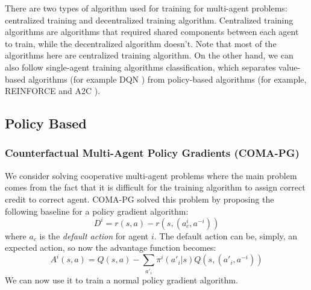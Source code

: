 \label{sec:chap2-deep-marl}

There are two types of algorithm used for training for multi-agent problems: centralized training and decentralized training algorithm. Centralized training algorithms are algorithms that required shared components between each agent to train, while the decentralized algorithm doesn't. Note that most of the algorithms here are centralized training algorithm. On the other hand, we can also follow single-agent training algorithms classification, which separates value-based algorithms (for example DQN \cite{mnih2015human}) from policy-based algorithms (for example, REINFORCE \cite{sutton2000policy} and A2C \cite{mnih2016asynchronous}). 

\subsection{Policy Based}

\subsubsection{Counterfactual Multi-Agent Policy Gradients (COMA-PG) \cite{foerster2018counterfactual}}
We consider solving cooperative multi-agent problems where the main problem comes from the fact that it is difficult for the training algorithm to assign correct credit to correct agent. COMA-PG \cite{foerster2018counterfactual} solved this problem by proposing the following baseline for a policy gradient algorithm:
\begin{equation}
    D^i = r(s, a) - r(s, (a_c^i, a^{-i}))
\end{equation}
where $a_c$ is the \textit{default action} for agent $i$. The default action can be, simply, an expected action, so now the advantage function becomes:
\begin{equation}
    A^i(s, a) = Q(s, a) - \sum_{a'_i} \pi^i(a'_i | s) Q(s, (a'_i,a^{-i}))
\end{equation}
We can now use it to train a normal policy gradient algorithm.

